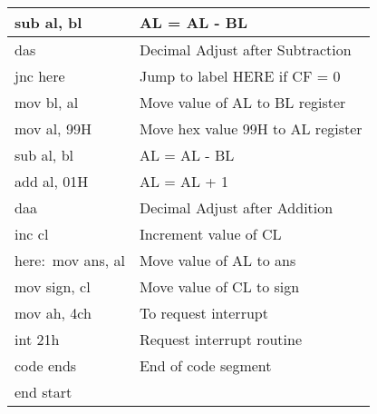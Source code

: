 \documentclass[10pt,a4paper]{article}
\begin{document}
\begin{flushleft}
\begin{table}[htb]
{\begin{tabular}{|l|l|}
\hline 
sub al, bl                                                       & AL = AL - BL                                  \\
\hline
das                                                              & Decimal Adjust after Subtraction              \\
\hline                                                           
jnc here                                                         & Jump to label HERE if CF = 0                  \\
\hline
mov bl, al                                                       & Move value of AL to BL register               \\
\hline
mov al, 99H                                                      & Move hex value 99H to AL register             \\
\hline
sub al, bl                                                       & AL = AL - BL                                  \\
\hline
add al, 01H                                                      & AL = AL + 1                                   \\
\hline 
daa                                                              & Decimal Adjust after Addition                 \\
\hline
inc cl                                                           & Increment value of CL                         \\
\hline
here:~mov ans, al                                                & Move value of AL to ans                       \\
\hline
mov sign, cl                                                     & Move value of CL to sign                      \\
\hline
mov ah, 4ch                                                      & To request interrupt                          \\
\hline
int 21h                                                          & Request interrupt routine                     \\ 
\hline
code ends                                                        & End of code segment                           \\
\hline
end start                                                        &                                               \\
\hline
\end{tabular}
}
\end{table}


\end{flushleft}
\end{document}
